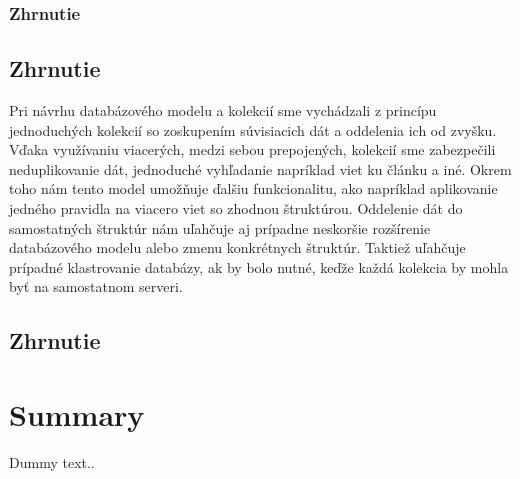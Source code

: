 %
%
{
	\subsubsection{Zhrnutie}
}
{
	\subsection{Zhrnutie}
}
\label{subsubsection:collections_summary}
Pri návrhu databázového modelu a kolekcií sme vychádzali z princípu jednoduchých kolekcií so zoskupením súvisiacich dát a oddelenia ich od zvyšku. Vďaka využívaniu viacerých, medzi sebou prepojených, kolekcií sme zabezpečili neduplikovanie dát, jednoduché vyhľadanie napríklad viet ku článku a iné. Okrem toho nám tento model umožňuje ďalšiu funkcionalitu, ako napríklad aplikovanie jedného pravidla na viacero viet so zhodnou štruktúrou. Oddelenie dát do samostatných štruktúr nám uľahčuje aj prípadne neskoršie rozšírenie databázového modelu alebo zmenu konkrétnych štruktúr. Taktiež uľahčuje prípadné klastrovanie databázy, ak by bolo nutné, keďže každá kolekcia by mohla byť na samostatnom serveri.

%
%
{
	\subsection{Zhrnutie}
}
{
	\section{Summary}
}
\label{subsection:design_summary}
Dummy text..